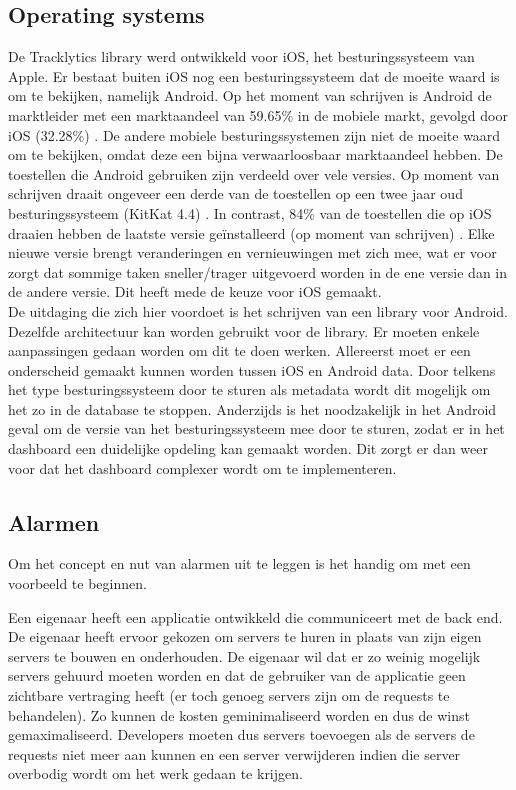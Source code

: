 \subsection{Operating systems} 
De Tracklytics library werd ontwikkeld voor iOS, het besturingssysteem van Apple. Er bestaat buiten iOS nog een besturingssysteem dat de moeite waard is om te bekijken, namelijk Android. Op het moment van schrijven is Android de marktleider met een marktaandeel van 59.65\% in de mobiele markt, gevolgd door iOS (32.28\%) \cite{MarketShare}. De andere mobiele besturingssystemen zijn niet de moeite waard om te bekijken, omdat deze een bijna verwaarloosbaar marktaandeel hebben. De toestellen die Android gebruiken zijn verdeeld over vele versies. Op moment van schrijven draait ongeveer een derde van de toestellen op een twee jaar oud besturingssysteem (KitKat 4.4) \cite{AndroidMS}. In contrast, 84\% van de toestellen die op iOS draaien hebben de laatste versie ge\"installeerd (op moment van schrijven) \cite{iOSMS}. Elke nieuwe versie brengt veranderingen en vernieuwingen met zich mee, wat er voor zorgt dat sommige taken sneller/trager uitgevoerd worden in de ene versie dan in de andere versie. Dit heeft mede de keuze voor iOS gemaakt. \\

De uitdaging die zich hier voordoet is het schrijven van een library voor Android. Dezelfde architectuur kan worden gebruikt voor de library. Er moeten enkele aanpassingen gedaan worden om dit te doen werken. Allereerst moet er een onderscheid gemaakt kunnen worden tussen iOS en Android data. Door telkens het type besturingssysteem door te sturen als metadata wordt dit mogelijk om het zo in de database te stoppen. Anderzijds is het noodzakelijk in het Android geval om de versie van het besturingssysteem mee door te sturen, zodat er in het dashboard een duidelijke opdeling kan gemaakt worden. Dit zorgt er dan weer voor dat het dashboard complexer wordt om te implementeren.





\subsection{Alarmen}
Om het concept en nut van alarmen uit te leggen is het handig om met een voorbeeld te beginnen. 

Een eigenaar heeft een applicatie ontwikkeld die communiceert met de back end. De eigenaar heeft ervoor gekozen om servers te huren in plaats van zijn eigen servers te bouwen en onderhouden. De eigenaar wil dat er zo weinig mogelijk servers gehuurd moeten worden en dat de gebruiker van de applicatie geen zichtbare vertraging heeft (er toch genoeg servers zijn om de requests te behandelen). Zo kunnen de kosten geminimaliseerd worden en dus de winst gemaximaliseerd. Developers moeten dus servers toevoegen als de servers de requests niet meer aan kunnen en een server verwijderen indien die server overbodig wordt om het werk gedaan te krijgen. 

